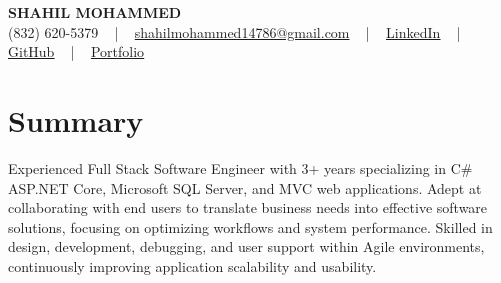 \documentclass[letterpaper,10pt]{article}
\begin{document}
\begin{center}
    {\fontsize{14pt}{12pt}\selectfont \textbf{\MakeUppercase{Shahil Mohammed}}}\\ \vspace{2pt}
    \fontsize{10pt}{12pt}\selectfont (832) 620-5379 ~ | ~ \href{mailto:shahilmohammed14786@gmail.com}{shahilmohammed14786@gmail.com} ~ | ~  
    \href{https://www.linkedin.com/in/shahil-mohammed-9652931a1/}{\color{blue}\underline{LinkedIn}}  ~ | ~ 
    \href{https://github.com/freakbeast14}{\color{blue}\underline{GitHub}} ~ | ~ 
    \href{https://shahil-mohammed.netlify.app/}{\color{blue}\underline{Portfolio}}
    \vspace{-8pt}
\end{center}

\section{Summary}
\vspace{-2pt}\fontsize{8pt}{9pt}\selectfont
Experienced Full Stack Software Engineer with 3+ years specializing in C\# ASP.NET Core, Microsoft SQL Server, and MVC web applications. Adept at collaborating with end users to translate business needs into effective software solutions, focusing on optimizing workflows and system performance. Skilled in design, development, debugging, and user support within Agile environments, continuously improving application scalability and usability.
 \vspace{-5pt}
 
\vspace{-2pt}
\end{document}
